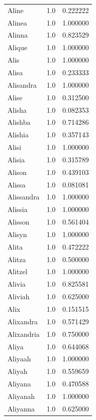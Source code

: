 \documentclass[
  letterpaper,
  DIV=11,
  numbers=noendperiod]{scrreprt}
\begin{document}
\begin{tabular}{lrr}
Aline           &   1.0 &   0.222222 \\
Alinea          &   1.0 &   1.000000 \\
Alinna          &   1.0 &   0.823529 \\
Alique          &   1.0 &   1.000000 \\
Alis            &   1.0 &   1.000000 \\
Alisa           &   1.0 &   0.233333 \\
Alisandra       &   1.0 &   1.000000 \\
Alise           &   1.0 &   0.312500 \\
Alisha          &   1.0 &   0.082353 \\
Alishba         &   1.0 &   0.714286 \\
Alishia         &   1.0 &   0.357143 \\
Alisi           &   1.0 &   1.000000 \\
Alisia          &   1.0 &   0.315789 \\
Alison          &   1.0 &   0.439103 \\
Alissa          &   1.0 &   0.081081 \\
Alissandra      &   1.0 &   1.000000 \\
Alissia         &   1.0 &   1.000000 \\
Alisson         &   1.0 &   0.561404 \\
Alisyn          &   1.0 &   1.000000 \\
Alita           &   1.0 &   0.472222 \\
Alitza          &   1.0 &   0.500000 \\
Alitzel         &   1.0 &   1.000000 \\
Alivia          &   1.0 &   0.825581 \\
Aliviah         &   1.0 &   0.625000 \\
Alix            &   1.0 &   0.151515 \\
Alixandra       &   1.0 &   0.571429 \\
Alixandria      &   1.0 &   0.750000 \\
Aliya           &   1.0 &   0.644068 \\
Aliyaah         &   1.0 &   1.000000 \\
Aliyah          &   1.0 &   0.559659 \\
Aliyana         &   1.0 &   0.470588 \\
Aliyanah        &   1.0 &   1.000000 \\
Aliyanna        &   1.0 &   0.625000 \\

\end{tabular}
\end{document}
